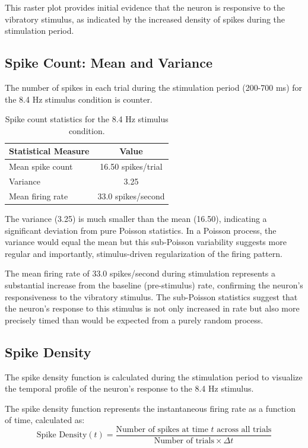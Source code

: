 \documentclass{article}
\begin{document}
This raster plot provides initial evidence that the neuron is responsive to the vibratory stimulus, as indicated by the increased density of spikes during the stimulation period.

\subsection{Spike Count: Mean and Variance}

The number of spikes in each trial during the stimulation period (200-700 ms) for the 8.4 Hz stimulus condition is counter.


\begin{table}[H]
\centering
\begin{tabular}{lc}
\toprule
\textbf{Statistical Measure} & \textbf{Value} \\
\midrule
Mean spike count    & 16.50 spikes/trial \\
Variance            & 3.25 \\
Mean firing rate    & 33.0 spikes/second \\
\bottomrule
\end{tabular}
\caption{Spike count statistics for the 8.4 Hz stimulus condition.}
\label{tab:spike_count_stats}
\end{table}

The variance (3.25) is much smaller than the mean (16.50), indicating a significant deviation from pure Poisson statistics. 
In a Poisson process, the variance would equal the mean but this sub-Poisson variability suggests more regular and importantly, stimulus-driven regularization of the firing pattern.


The mean firing rate of 33.0 spikes/second during stimulation represents a substantial increase from the baseline (pre-stimulus) rate, confirming the neuron's responsiveness to the vibratory stimulus. The sub-Poisson statistics suggest that the neuron's response to this stimulus is not only increased in rate but also more precisely timed than would be expected from a purely random process.

\subsection{Spike Density}

The spike density function is calculated during the stimulation period to visualize the temporal profile of the neuron's response to the 8.4 Hz stimulus.

The spike density function represents the instantaneous firing rate as a function of time, calculated as:
\begin{equation}
    \text{Spike Density}(t) = \frac{\text{Number of spikes at time } t \text{ across all trials}}{\text{Number of trials} \times \Delta t}
\end{equation}
\end{document}
